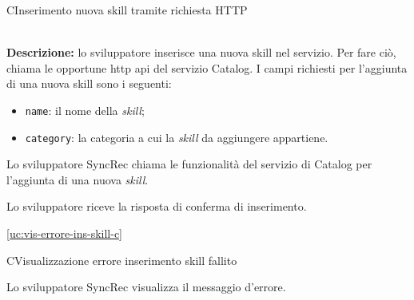 \begin{usecase}{4}{C}{Inserimento nuova skill tramite richiesta HTTP}


	\textbf{\\Descrizione:} lo sviluppatore inserisce una nuova skill nel servizio. Per fare ciò, chiama le opportune \acrshort{http} \acrshort{api} del servizio Catalog. I campi richiesti per l'aggiunta di una nuova skill sono i seguenti:
	\begin{itemize}
		\item \texttt{name}: il nome della \textit{skill};
		\item \texttt{category}: la categoria a cui la \textit{skill} da aggiungere appartiene.
	\end{itemize}

	\begin{ucscenarioprincipale}
		\item Lo sviluppatore SyncRec chiama le funzionalità del servizio di Catalog per l'aggiunta di una nuova \textit{skill}.
		\item Lo sviluppatore riceve la risposta di conferma di inserimento.
	\end{ucscenarioprincipale}


	\begin{ucestensioni}
		\item \ref{uc:vis-errore-ins-skill-c}
	\end{ucestensioni}

	\label{uc:ins-skill-http-c}
\end{usecase}

\begin{usecase}{5}{C}{Visualizzazione errore inserimento skill fallito}



	\begin{ucscenarioprincipale}
		\item Lo sviluppatore SyncRec visualizza il messaggio d'errore.
	\end{ucscenarioprincipale}


	\label{uc:vis-errore-ins-skill-c}

\end{usecase}

